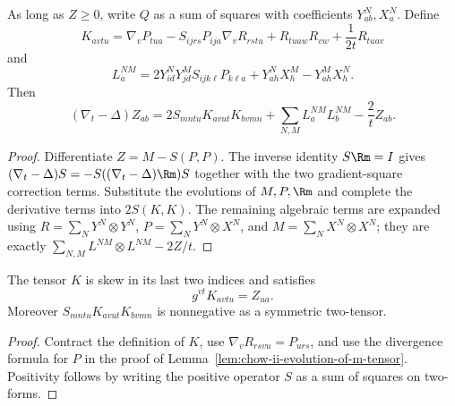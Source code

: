 \begin{theorem}
\label{thm:chow-ii-minimizing-harnack-two-tensor-evolution}
As long as \(Z\ge0\), write \(Q\) as a sum of squares with coefficients
\(Y^N_{ab},X^N_a\).  Define
\[
K_{avtu}=\nabla_vP_{tua}-S_{ijrs}P_{ija}\nabla_vR_{rstu}
+R_{tuaw}R_{vw}+\frac1{2t}R_{tuav}
\]
and
\[
L_a^{NM}=2Y_{id}^NY_{jd}^MS_{ijk\ell}P_{k\ell a}
+Y_{ah}^NX_h^M-Y_{ah}^MX_h^N.
\]
Then
\[
(\nabla_t-\Delta)Z_{ab}=2S_{mntu}K_{avut}K_{bvmn}
+\sum_{N,M}L_a^{NM}L_b^{NM}-\frac2tZ_{ab}.
\]
\end{theorem}
\begin{proof}
\sketch Differentiate \(Z=M-S(P,P)\).  The inverse identity \(S\Rm=I\) gives
\((\nabla_t-\Delta)S=-S((\nabla_t-\Delta)\Rm)S\) together with the two
gradient-square correction terms.  Substitute the evolutions of \(M,P,\Rm\)
and complete the derivative terms into \(2S(K,K)\).  The remaining algebraic
terms are expanded using
\(R=\sum_NY^N\otimes Y^N\),
\(P=\sum_NY^N\otimes X^N\), and
\(M=\sum_NX^N\otimes X^N\); they are exactly
\(\sum_{N,M}L^{NM}\otimes L^{NM}-2Z/t\).
\end{proof}

\begin{remark}
\label{rem:chow-ii-k-tensor-trace-is-z}
The tensor \(K\) is skew in its last two indices and satisfies
\[
g^{vt}K_{avtu}=Z_{ua}.
\]
Moreover \(S_{mntu}K_{avut}K_{bvmn}\) is nonnegative as a symmetric
two-tensor.
\end{remark}
\begin{proof}
\sketch Contract the definition of \(K\), use
\(\nabla_vR_{rsvu}=P_{urs}\), and use the divergence formula for \(P\) in
the proof of Lemma~\ref{lem:chow-ii-evolution-of-m-tensor}.  Positivity follows
by writing the positive operator \(S\) as a sum of squares on two-forms.
\end{proof}

